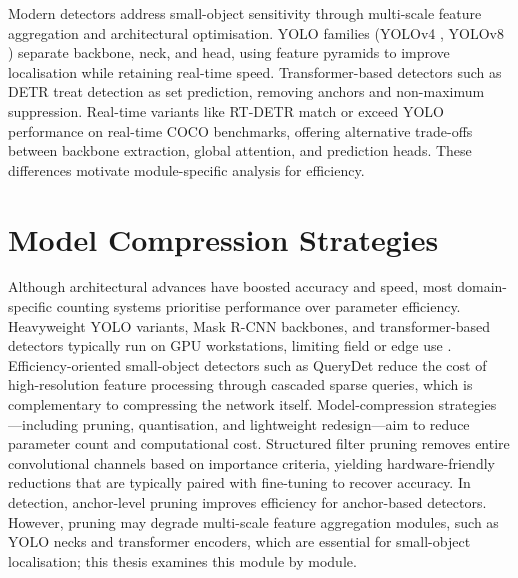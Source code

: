 \begin{sloppypar}
Modern detectors address small-object sensitivity through multi-scale feature aggregation and architectural optimisation. YOLO families (YOLOv4 \cite{Bochkovskiy2020YOLOv4}, YOLOv8 \cite{yolov8}) separate backbone, neck, and head, using feature pyramids to improve localisation while retaining real-time speed. Transformer-based detectors such as DETR \cite{Carion2020DETR} treat detection as set prediction, removing anchors and non-maximum suppression. Real-time variants like RT-DETR \cite{Zhao2023RTDETR} match or exceed YOLO performance on real-time COCO benchmarks, offering alternative trade-offs between backbone extraction, global attention, and prediction heads. These differences motivate module-specific analysis for efficiency.
\end{sloppypar}

\section{Model Compression Strategies}

\begin{sloppypar}
Although architectural advances have boosted accuracy and speed, most domain-specific counting systems prioritise performance over parameter efficiency. Heavyweight YOLO variants, Mask R-CNN backbones, and transformer-based detectors typically run on GPU workstations, limiting field or edge use \cite{He2025}. Efficiency-oriented small-object detectors such as QueryDet \cite{Yang2022QueryDet} reduce the cost of high-resolution feature processing through cascaded sparse queries, which is complementary to compressing the network itself. Model-compression strategies \cite{He2025}---including pruning, quantisation, and lightweight redesign---aim to reduce parameter count and computational cost. Structured filter pruning \cite{Li2017FilterPruning,Luo2017ThiNet} removes entire convolutional channels based on importance criteria, yielding hardware-friendly reductions that are typically paired with fine-tuning to recover accuracy. In detection, anchor-level pruning \cite{Bonnaerens2022AnchorPruning} improves efficiency for anchor-based detectors. However, pruning may degrade multi-scale feature aggregation modules, such as YOLO necks and transformer encoders, which are essential for small-object localisation; this thesis examines this module by module.
\end{sloppypar}

